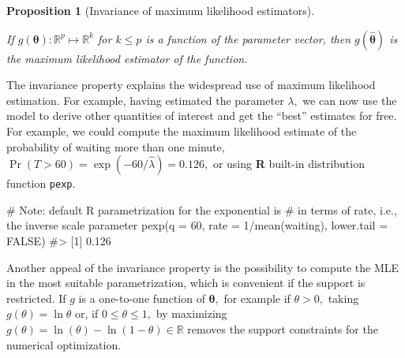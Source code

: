 \documentclass[
  11pt,
  letterpaper,
]{scrbook}
\newenvironment{Shaded}{\begin{snugshade}}{\end{snugshade}}
\newcommand{\AttributeTok}[1]{\textcolor[rgb]{0.40,0.45,0.13}{#1}}
\newcommand{\CommentTok}[1]{\textcolor[rgb]{0.37,0.37,0.37}{#1}}
\newcommand{\ConstantTok}[1]{\textcolor[rgb]{0.56,0.35,0.01}{#1}}
\newcommand{\DecValTok}[1]{\textcolor[rgb]{0.68,0.00,0.00}{#1}}
\newcommand{\FunctionTok}[1]{\textcolor[rgb]{0.28,0.35,0.67}{#1}}
\newcommand{\NormalTok}[1]{\textcolor[rgb]{0.00,0.23,0.31}{#1}}
\newcommand{\SpecialCharTok}[1]{\textcolor[rgb]{0.37,0.37,0.37}{#1}}
\theoremstyle{plain}
\newtheorem{proposition}{Proposition}[chapter]
\theoremstyle{definition}
\theoremstyle{definition}
\theoremstyle{remark}
\begin{document}
\begin{proposition}[Invariance of maximum likelihood
estimators]\protect\hypertarget{prp-invariance-mle}{}\label{prp-invariance-mle}

If \(g(\boldsymbol{\theta}): \mathbb{R}^p \mapsto \mathbb{R}^k\) for
\(k \leq p\) is a function of the parameter vector, then
\(g(\widehat{\boldsymbol{\theta}})\) is the maximum likelihood estimator
of the function.

\end{proposition}

The invariance property explains the widespread use of maximum
likelihood estimation. For example, having estimated the parameter
\(\lambda,\) we can now use the model to derive other quantities of
interest and get the ``best'' estimates for free. For example, we could
compute the maximum likelihood estimate of the probability of waiting
more than one minute,
\(\Pr(T>60) = \exp(-60/\widehat{\lambda})= 0.126,\) or using \textbf{R}
built-in distribution function \texttt{pexp}.

\begin{Shaded}
\begin{Highlighting}[]
\CommentTok{\# Note: default R parametrization for the exponential is }
\CommentTok{\# in terms of rate, i.e., the inverse scale parameter}
\FunctionTok{pexp}\NormalTok{(}\AttributeTok{q =} \DecValTok{60}\NormalTok{, }\AttributeTok{rate =} \DecValTok{1}\SpecialCharTok{/}\FunctionTok{mean}\NormalTok{(waiting), }\AttributeTok{lower.tail =} \ConstantTok{FALSE}\NormalTok{)}
\CommentTok{\#\textgreater{} [1] 0.126}
\end{Highlighting}
\end{Shaded}

Another appeal of the invariance property is the possibility to compute
the MLE in the most suitable parametrization, which is convenient if the
support is restricted. If \(g\) is a one-to-one function of
\(\boldsymbol{\theta},\) for example if \(\theta >0,\) taking
\(g(\theta) = \ln \theta\) or, if \(0 \leq \theta \leq 1,\) by
maximizing \(g(\theta) = \ln(\theta) - \ln(1-\theta) \in \mathbb{R}\)
removes the support constraints for the numerical optimization.
\end{document}
